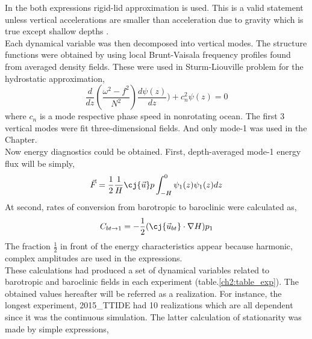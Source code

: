 \documentclass[12pt]{article}
\begin{document}
In the both expressions rigid-lid approximation is used. This is a valid statement unless vertical 
accelerations are smaller than acceleration due to gravity which is true except shallow depths 
\cite{kelly2010}.\\
Each dynamical variable was then decomposed into vertical modes. The structure functions were 
obtained by using local Brunt-Vaisala frequency profiles found from averaged density fields. These 
were used in Sturm-Liouville problem for the hydrostatic approximation,
\begin{equation}
\frac{d}{dz}(\frac{\omega^2 - f^2}{N^2} ) \frac{d \psi(z)}{dz}) + c^2_n \psi(z) = 0
\end{equation}
where $c_n$ is a mode respective phase speed in nonrotating ocean. The first 3 vertical modes were 
fit three-dimensional fields. And only mode-1 was used in the Chapter.\\
Now energy diagnostics could be obtained. First, depth-averaged mode-1 energy flux will be simply,
\begin{equation}
\vec{F} = \frac{1}{2} \frac{1}{H} \cj{\vec{u}} p \int_{-H}^{0} \psi_1(z) \psi_1(z) dz
\end{equation}
At second, rates of conversion from barotropic to baroclinic \citep{simmons2004internal, 
kurapov2003m} were calculated as,
\begin{equation}
C_{bt\to 1} = -\frac{1}{2}(\cj{\vec{u}_{bt}} \cdot \nabla H) p_{1}
\end{equation}
The fraction $\frac{1}{2}$ in front of the energy characteristics appear because harmonic, complex 
amplitudes are used in the expressions.\\
These calculations had produced a set of dynamical variables related to barotropic and baroclinic 
fields in each experiment (table.\ref{ch2:table_exp}). The obtained values hereafter will be 
referred as a realization. For instance, the longest experiment, 2015\_TTIDE had 10 realizations 
which are all dependent since it was the continuous simulation. The latter calculation of 
stationarity was made by simple expressions,
\end{document}
